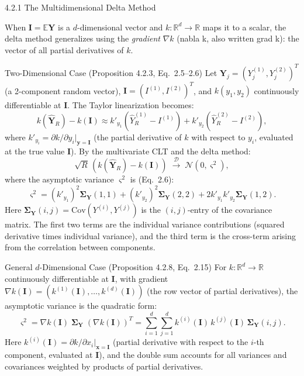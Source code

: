 \documentclass[aspectratio=169,10pt]{beamer}
\begin{document}
\begin{frame}[allowframebreaks]{4.2.1 The Multidimensional Delta Method}

When $\mathbf{I} = \mathbb{E}\mathbf{Y}$ is a $d$-dimensional vector
and $k : \mathbb{R}^d \to \mathbb{R}$ maps it to a scalar, the delta
method generalizes using the \emph{gradient} $\nabla k$ (nabla k,
also written grad k): the vector of all partial derivatives of $k$.

\begin{block}{Two-Dimensional Case (Proposition 4.2.3, Eq.\ 2.5--2.6)}
  Let $\mathbf{Y}_j = (Y_j^{(1)}, Y_j^{(2)})^T$ (a 2-component random
  vector), $\mathbf{I} = (I^{(1)}, I^{(2)})^T$, and $k(y_1, y_2)$
  continuously differentiable at $\mathbf{I}$.  The Taylor linearization
  becomes:
  \[
    k(\hat{\mathbf{Y}}_R) - k(\mathbf{I})
      \approx k'_{y_1}(\hat{Y}_R^{(1)} - I^{(1)}) + k'_{y_2}(\hat{Y}_R^{(2)} - I^{(2)}),
  \]
  where $k'_{y_i} = \partial k/\partial y_i\big|_{\mathbf{y}=\mathbf{I}}$
  (the partial derivative of $k$ with respect to $y_i$, evaluated at the
  true value $\mathbf{I}$).  By the multivariate CLT and the delta method:
  \[
    \sqrt{R}\,(k(\hat{\mathbf{Y}}_R) - k(\mathbf{I}))
      \;\xrightarrow{\mathcal{D}}\; \mathcal{N}(0, \varsigma^2),
  \]
  where the asymptotic variance $\varsigma^2$ is (Eq.\ 2.6):
  \[
    \varsigma^2 = (k'_{y_1})^2\boldsymbol{\Sigma}_{\mathbf{Y}}(1,1)
      + (k'_{y_2})^2\boldsymbol{\Sigma}_{\mathbf{Y}}(2,2)
      + 2k'_{y_1}k'_{y_2}\boldsymbol{\Sigma}_{\mathbf{Y}}(1,2). \tag{2.6}
  \]
  Here $\boldsymbol{\Sigma}_{\mathbf{Y}}(i,j) = \mathrm{Cov}(Y^{(i)}, Y^{(j)})$
  is the $(i,j)$-entry of the covariance matrix.  The first two terms
  are the individual variance contributions (squared derivative times
  individual variance), and the third term is the cross-term arising
  from the correlation between components.
\end{block}

\begin{block}{General $d$-Dimensional Case (Proposition 4.2.8, Eq.\ 2.15)}
  For $k : \mathbb{R}^d \to \mathbb{R}$ continuously differentiable at
  $\mathbf{I}$, with gradient
  $\nabla k(\mathbf{I}) = (k^{(1)}(\mathbf{I}), \ldots, k^{(d)}(\mathbf{I}))$
  (the row vector of partial derivatives), the asymptotic variance is
  the quadratic form:
  \[
    \varsigma^2 = \nabla k(\mathbf{I})\;\boldsymbol{\Sigma}_{\mathbf{Y}}\;(\nabla k(\mathbf{I}))^T
      = \sum_{i=1}^d\sum_{j=1}^d k^{(i)}(\mathbf{I})\,k^{(j)}(\mathbf{I})\,
        \boldsymbol{\Sigma}_{\mathbf{Y}}(i,j). \tag{2.15}
  \]
  Here $k^{(i)}(\mathbf{I}) = \partial k/\partial x_i\big|_{\mathbf{x}=\mathbf{I}}$
  (partial derivative with respect to the $i$-th component, evaluated at
  $\mathbf{I}$), and the double sum accounts for all variances and
  covariances weighted by products of partial derivatives.
\end{block}


\end{frame}
\end{document}
